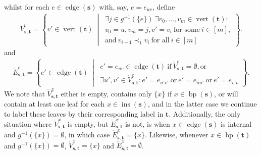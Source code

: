 \documentclass[a4paper, final]{amsart}
\theoremstyle{plain}
\theoremstyle{definition}
\newcommand{\tree}[1][t]{\boldsymbol{#1}}
\DeclareMathOperator{\edge}{edge}
\DeclareMathOperator{\vertices}{vert}
\DeclareMathOperator{\insertable}{ins}
\DeclareMathOperator{\branchpoints}{bp}
\newcommand{\insertablef}[1][\tree]{\insertable({\tree[#1]})}
\begin{document}
  whilst for each $e \in \edge (\tree[s])$ with, say, $e = e_{uv}$, define
  \begin{align*}
    \mathring{V}_{\tree[s], \tree}^e
    = \left\{ v' \in \vertices(\tree) \ \middle \vert \
      \begin{matrix}
        \exists j \in g^{-1}(\{e\})\ \exists v_0, \ldots, v_m \in \vertices (\tree) \colon \\
        v_0 = u, v_m = j, v' = v_i \ \text{for some}\ i \in [m], \\
        \text{and}\ v_{i-1} \prec_{\tree} v_i \ \text{for all}\ i \in [m]
      \end{matrix}
    \right\}.
  \end{align*}
  and
  \begin{align*}
    \mathring{E}_{\tree[s],\tree}^e
    = \left\{ e' \in \edge(\tree) \ \middle \vert \
      \begin{matrix}
        e' = e_{uv} \in \edge (\tree) \ \text{if}\ \mathring{V}_{\tree[s], \tree}^e = \emptyset, \text{or} \\
      \exists u', v' \in \mathring{V}_{\tree[s], \tree}^e \colon e' = e_{u'v'} \ \text{or}\ e' = e_{uu'} \ \text{or}\ e' = e_{v'v}
    \end{matrix}
  \right\}.
  \end{align*}
  We note that $\mathring{V}_{\tree[s], \tree}^x$ either is empty, contains only $\{x\}$ if $x \in \branchpoints (\tree[s])$,  or will contain at least one leaf for each $x \in \insertablef[s]$, and in the latter case we continue to label these leaves by their corresponding label in $\tree$.
  Additionally, the only situation where $\mathring{V}_{\tree[s], \tree}^x$ is empty, but $\mathring{E}_{\tree[s], \tree}^x$ is not, is when $x \in \edge(\tree[s])$ is internal and $g^{-1}(\{x\}) = \emptyset$, in which case $\mathring{E}_{\tree[s], \tree}^x = \{x\}$.
  Likewise, whenever $x \in \branchpoints (\tree)$ and $g^{-1}(\{ x \}) = \emptyset$, $\mathring{V}_{\tree[s], \tree}^x = \{x\}$ and $\mathring{E}_{\tree[s], \tree}^x = \emptyset$.
\end{document}

